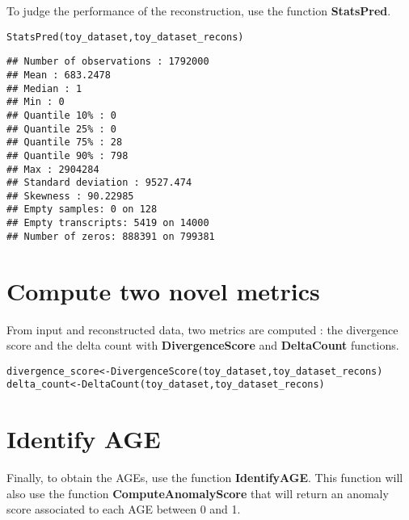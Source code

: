 \documentclass[9pt]{article}\usepackage[]{graphicx}\usepackage[usenames,dvipsnames]{color}
\newcommand{\hlstd}[1]{\textcolor[rgb]{0.251,0.251,0.251}{#1}}%
\newcommand{\hlkwb}[1]{\textcolor[rgb]{0,0,0}{#1}}%
\newcommand{\hlkwd}[1]{\textcolor[rgb]{0.878,0.439,0.125}{#1}}%
\newenvironment{knitrout}{}{} %
\begin{document}
To judge the performance of the reconstruction, use the function \textbf{StatsPred}.

\begin{knitrout}
\color{fgcolor}\begin{kframe}
\begin{alltt}
\hlkwd{StatsPred}\hlstd{(toy_dataset, toy_dataset_recons)}
\end{alltt}
\begin{verbatim}
## Number of observations : 1792000 
## Mean : 683.2478 
## Median : 1 
## Min : 0 
## Quantile 10% : 0 
## Quantile 25% : 0 
## Quantile 75% : 28 
## Quantile 90% : 798 
## Max : 2904284 
## Standard deviation : 9527.474 
## Skewness : 90.22985 
## Empty samples: 0 on 128 
## Empty transcripts: 5419 on 14000 
## Number of zeros: 888391 on 799381
\end{verbatim}
\end{kframe}
\end{knitrout}

\section{Compute two novel metrics}

From input and reconstructed data, two metrics are computed : the divergence score and the delta count with \textbf{DivergenceScore} and \textbf{DeltaCount} functions.

\begin{knitrout}
\color{fgcolor}\begin{kframe}
\begin{alltt}
\hlstd{divergence_score} \hlkwb{<-} \hlkwd{DivergenceScore}\hlstd{(toy_dataset, toy_dataset_recons)}
\hlstd{delta_count} \hlkwb{<-} \hlkwd{DeltaCount}\hlstd{(toy_dataset, toy_dataset_recons)}
\end{alltt}
\end{kframe}
\end{knitrout}

\section{Identify AGE}

Finally, to obtain the AGEs, use the function \textbf{IdentifyAGE}. This function will also use the function \textbf{ComputeAnomalyScore} that will return an anomaly score associated to each AGE between 0 and 1.
\end{document}
